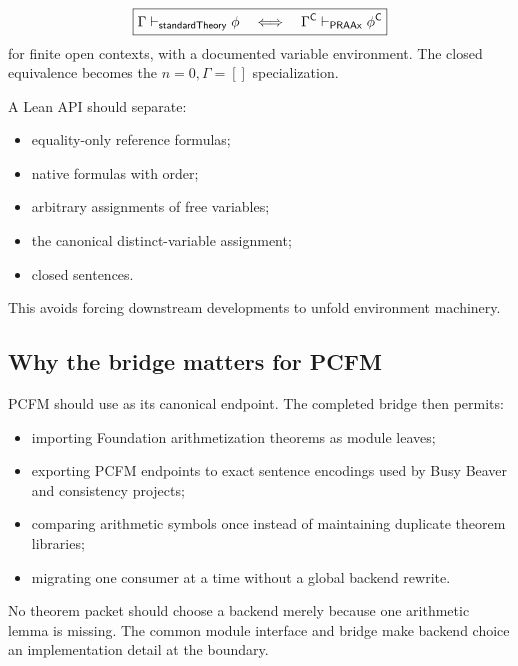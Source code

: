 \[
\boxed{
 \Gamma\vdash_{\mathsf{standardTheory}}\phi
 \quad\Longleftrightarrow\quad
 \Gamma^{\mathsf C}\vdash_{\mathsf{PRAAx}}\phi^{\mathsf C}
}
\]
for finite open contexts, with a documented variable environment.  The closed
equivalence becomes the \(n=0,\Gamma=[]\) specialization.

A Lean API should separate:
\begin{itemize}
\item equality-only reference formulas;
\item native formulas with order;
\item arbitrary assignments of free variables;
\item the canonical distinct-variable assignment;
\item closed sentences.
\end{itemize}
This avoids forcing downstream developments to unfold environment machinery.

\subsection{Why the bridge matters for PCFM}

PCFM should use  as its canonical endpoint.  The completed
bridge then permits:
\begin{itemize}
\item importing Foundation arithmetization theorems as module leaves;
\item exporting PCFM endpoints to exact sentence encodings used by Busy Beaver
and consistency projects;
\item comparing arithmetic symbols once instead of maintaining duplicate
theorem libraries;
\item migrating one consumer at a time without a global backend rewrite.
\end{itemize}

No theorem packet should choose a backend merely because one arithmetic lemma
is missing.  The common module interface and bridge make backend choice an
implementation detail at the boundary.
